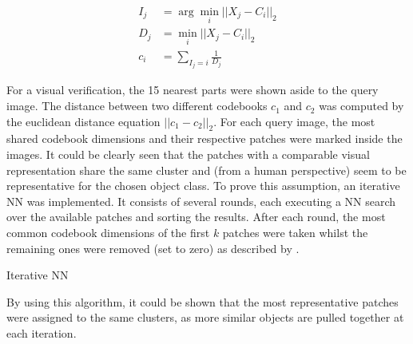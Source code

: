 \begin{align}
	I_j &= \arg \min_i ||X_j - C_i||_2 \\
	D_j &= \min_i ||X_j - C_i||_2 \\
	c_i &= \sum_{I_j = i} \frac{1}{D_j}
	\label{eqn:codebook_calc}
\end{align}

For a visual verification, the 15 nearest parts were shown aside to the query image. The distance between two different codebooks $c_1$ and $c_2$ was computed by the euclidean distance equation $||c_1-c_2||_2$.
For each query image, the most shared codebook dimensions and their respective patches were marked inside the images. It could be clearly seen that the patches with a comparable visual representation share the same cluster and (from a human perspective) seem to be representative for the chosen object class.
To prove this assumption, an iterative \ac{NN} was implemented. It consists of several rounds, each executing a \ac{NN} search over the available patches and sorting the results. After each round, the most common codebook dimensions of the first $k$ patches were taken whilst the remaining ones were removed (set to zero) as described by .

\begin{algorithm}
	\caption{Iterative \ac{NN}}
	\label{alg:iterative_nn}
\end{algorithm}

By using this algorithm, it could be shown that the most representative patches were assigned to the same clusters, as more similar objects are pulled together at each iteration.

